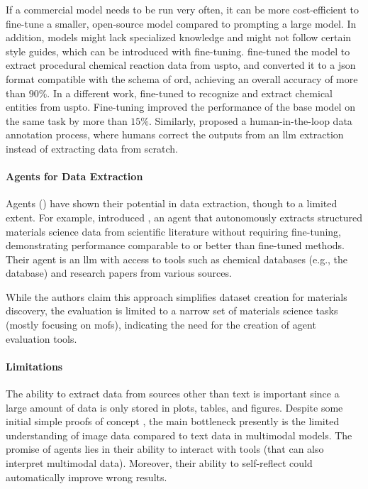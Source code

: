 If a commercial model needs to be run very often, it can be more cost-efficient to fine-tune a smaller, open-source model compared to prompting a large model. 
In addition, models might lack specialized knowledge and might not follow certain style guides, which can be introduced with fine-tuning. 
\textcite{ai2024extracting} fine-tuned the  model to extract procedural chemical reaction data from \gls{uspto}, and converted it to a \gls{json} format compatible with the schema of \gls{ord}\autocite{Kearnes_2021}, achieving an overall accuracy of more than $90\%$. 
In a different work, \textcite{zhang2024fine} fine-tuned  to recognize and extract chemical entities from \gls{uspto}. Fine-tuning improved the performance of the base model on the same task by more than $15\%$. Similarly, \textcite{dagdelen2024structured} proposed a human-in-the-loop data annotation process, where humans correct the outputs from an \gls{llm} extraction instead of extracting data from scratch.

\paragraph{Agents for Data Extraction} 

Agents () have shown their potential in data extraction, though to a limited extent.\autocite{chen2024autonomous,kang2024chatmof}
For example, \textcite{ansari2024agent} introduced , an agent that autonomously extracts structured materials science data from scientific literature without requiring fine-tuning, demonstrating performance comparable to or better than fine-tuned methods. Their agent is an \gls{llm} with access to tools such as chemical databases (e.g., the  database) and research papers from various sources.

While the authors claim this approach simplifies dataset creation for materials discovery, the evaluation is limited to a narrow set of materials science tasks (mostly focusing on \glspl{mof}), indicating the need for the creation of agent evaluation tools.


\paragraph{Limitations} 
The ability to extract data from sources other than text is important since a large amount of data is only stored in plots, tables, and figures. 
Despite some initial simple proofs of concept \autocite{Zheng2024image}, the main bottleneck presently is the limited understanding of image data compared to text data in multimodal models.\autocite{alampara2024probing} The promise of agents lies in their ability to interact with tools (that can also interpret multimodal data). Moreover, their ability to self-reflect could automatically improve wrong results.\autocite{du2023improving}


